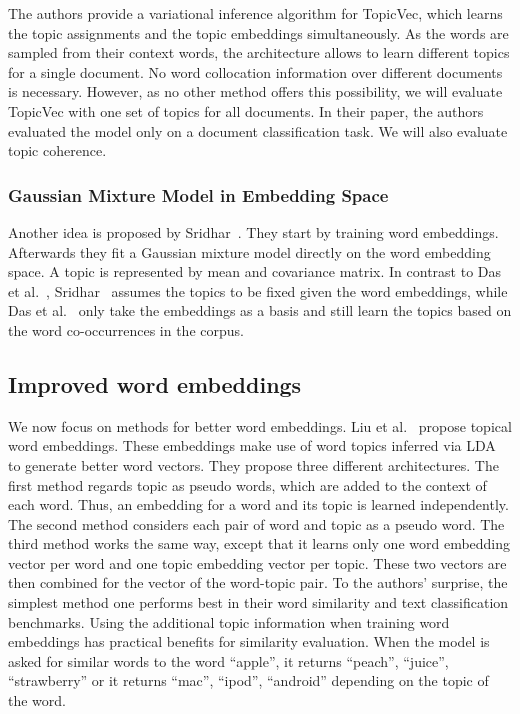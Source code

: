 \documentclass[
        a4paper,
        titlepage,
        twoside,
        parskip
        ]{scrbook}
\theoremstyle{break}
\begin{document}
The authors provide a variational inference algorithm for TopicVec, which learns the topic assignments and the topic embeddings simultaneously.
As the words are sampled from their context words, the architecture allows to learn different topics for a single document.
No word collocation information over different documents is necessary.
However, as no other method offers this possibility, we will evaluate TopicVec with one set of topics for all documents.
In their paper, the authors evaluated the model only on a document classification task.
We will also evaluate topic coherence.

\subsubsection{Gaussian Mixture Model in Embedding Space}
Another idea is proposed by Sridhar~\cite{Sridhar2015}.
They start by training word embeddings.
Afterwards they fit a Gaussian mixture model directly on the word embedding space.
A topic is represented by mean and covariance matrix.
In contrast to Das et al.~\cite{Das2015}, Sridhar~\cite{Sridhar2015} assumes the topics to be fixed given the word embeddings, while Das et al.~\cite{Das2015} only take the embeddings as a basis and still learn the topics based on the word co-occurrences in the corpus.


\subsection{Improved word embeddings}
We now focus on methods for better word embeddings.
Liu et al.~\cite{Liu2015} propose topical word embeddings.
These embeddings make use of word topics inferred via LDA to generate better word vectors.
They propose three different architectures.
The first method regards topic as pseudo words, which are added to the context of each word.
Thus, an embedding for a word and its topic is learned independently.
The second method considers each pair of word and topic as a pseudo word.
The third method works the same way, except that it learns only one word embedding vector per word and one topic embedding vector per topic.
These two vectors are then combined for the vector of the word-topic pair.
To the authors' surprise, the simplest method one performs best in their word similarity and text classification benchmarks.
Using the additional topic information when training word embeddings has practical benefits for similarity evaluation.
When the model is asked for similar words to the word ``apple'', it returns ``peach'', ``juice'', ``strawberry'' or it returns ``mac'', ``ipod'', ``android'' depending on the topic of the word.
\end{document}
